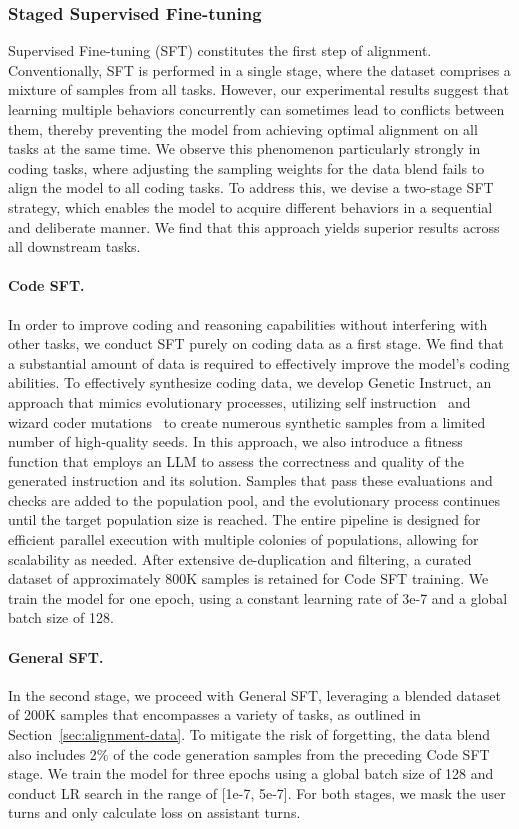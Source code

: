 \documentclass[11pt]{article}
\begin{document}
\subsubsection{Staged Supervised Fine-tuning}
Supervised Fine-tuning (SFT) constitutes the first step of alignment. Conventionally, SFT is performed in a single stage, where the dataset comprises a mixture of samples from all tasks. However, our experimental results suggest that learning multiple behaviors concurrently can sometimes lead to conflicts between them, thereby preventing the model from achieving optimal alignment on all tasks at the same time. We observe this phenomenon particularly strongly in coding tasks, where adjusting the sampling weights for the data blend fails to align the model to all coding tasks. To address this,  we devise a two-stage SFT strategy, which enables the model to acquire different behaviors in a sequential and deliberate manner. We find that this approach yields superior results across all downstream tasks.

\paragraph{Code SFT.}
In order to improve coding and reasoning capabilities without interfering with other tasks, we conduct SFT purely on coding data as a first stage. We find that a substantial amount of data is required to effectively improve the model's coding abilities.
To effectively synthesize coding data, we develop Genetic Instruct, an approach that mimics evolutionary processes, utilizing self instruction~\citep{wang2022self}
 and wizard coder mutations~\citep{luo2023wizardcoder} to create numerous synthetic samples from a limited number
of high-quality seeds. In this approach, we also introduce a fitness function that employs an LLM to assess the correctness and
quality of the generated instruction and its solution. Samples that pass these evaluations
and checks are added to the population pool, and the evolutionary process continues until
the target population size is reached. The entire pipeline is designed for efficient parallel
execution with multiple colonies of populations, allowing for scalability as needed.
After extensive de-duplication and filtering, a curated dataset of approximately 800K samples is retained for Code SFT training. We train the model for one epoch, using a constant learning rate of 3e-7 and a global batch size of 128. 

\paragraph{General SFT.}
In the second stage, we proceed with General SFT, leveraging a blended dataset of 200K samples that encompasses a variety of tasks, as outlined in Section~\ref{sec:alignment-data}. To mitigate the risk of forgetting, the data blend also includes 2\% of the code generation samples from the preceding Code SFT stage. We train the model for three epochs using a global batch size of 128 and conduct LR search in the range of [1e-7, 5e-7]. For both stages, we mask the user turns and only calculate loss on assistant turns. 
\end{document}
